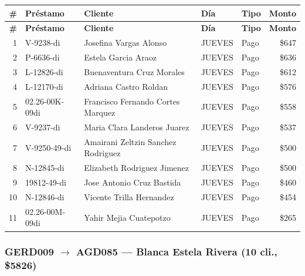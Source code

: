 \documentclass[11pt,a4paper]{article}
\newcommand{\money}[1]{\$\num{#1}}
\begin{document}
\begin{center}
\renewcommand{\arraystretch}{1.1}
\footnotesize
\begin{longtable}{rlp{5.5cm}llr}
\toprule
\textbf{\#} & \textbf{Pr\'estamo} & \textbf{Cliente} & \textbf{D\'ia} & \textbf{Tipo} & \textbf{Monto} \\
\midrule
\endfirsthead
\toprule
\textbf{\#} & \textbf{Pr\'estamo} & \textbf{Cliente} & \textbf{D\'ia} & \textbf{Tipo} & \textbf{Monto} \\
\midrule
\endhead
1 & V-9238-di & Josefina Vargas Alonso & JUEVES & Pago & \money{647} \\
2 & P-6636-di & Estela Garcia Araoz & JUEVES & Pago & \money{636} \\
3 & L-12826-di & Buenaventura Cruz Morales & JUEVES & Pago & \money{612} \\
4 & L-12170-di & Adriana Castro Roldan & JUEVES & Pago & \money{576} \\
5 & 02.26-00K-09di & Francisco Fernando Cortes Marquez & JUEVES & Pago & \money{558} \\
6 & V-9237-di & Maria Clara Landeros Juarez & JUEVES & Pago & \money{537} \\
7 & V-9250-49-di & Amairani Zeltzin Sanchez Rodriguez & JUEVES & Pago & \money{500} \\
8 & N-12845-di & Elizabeth Rodriguez Jimenez & JUEVES & Pago & \money{500} \\
9 & 19812-49-di & Jose Antonio Cruz Bastida & JUEVES & Pago & \money{460} \\
10 & N-12846-di & Vicente Trilla Hernandez & JUEVES & Pago & \money{454} \\
11 & 02.26-00M-09di & Yahir Mejia Cuatepotzo & JUEVES & Pago & \money{265} \\

\bottomrule
\end{longtable}
\end{center}
\subsubsection{GERD009 $\rightarrow$ AGD085 --- Blanca Estela Rivera (10 cli., \money{5826})}
\end{document}
